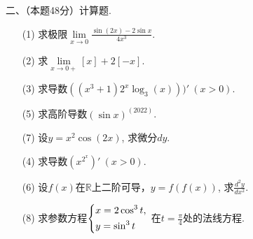 \documentclass[UTF8,a4paper,10pt]{ctexart}
\begin{document}
\noindent 二、（本题48分）计算题.\\





\noindent
\begin{minipage}{.5\textwidth}
\begin{itemize}
\item[(1)]
求极限$\lim\limits_{x \to 0} \frac{\sin{(2x)}-2\sin {x}}{4x^3}$.
\vspace{5cm}
\end{itemize}  
\end{minipage}
\hfill
\begin{minipage}{.4\textwidth}
\begin{itemize}
\item[(2)]
求$\lim\limits_{x \to 0+} [x]+2[-x]. $
\vspace{5cm}
\end{itemize}
\end{minipage}





\newpage
\noindent
\begin{minipage}{.45\textwidth}
\begin{itemize}
\item[(3)]
求导数$((x^3+1)2^x\log_3(x)))' \ (x > 0)$.
\vspace{5cm}
\item[(5)] 
求高阶导数$(\sin x)^{(2022)}$. 
 \vspace{5cm}
\item[(7)] 
设$y=x^2\cos(2x)$, 求微分$dy$.
\vspace{6cm}
\end{itemize}  
\end{minipage}
\hfill
\begin{minipage}{.55\textwidth}
\begin{itemize}
\item[(4)]
求导数$(x^{2^{x}})' \ (x > 0)$. 
\vspace{5cm}
\item[(6)]
设$f(x)$在$\mathbb{R}$上二阶可导，$y=f(f(x))$, 求$\frac{d^2y}{dx^2}$.
\vspace{5cm}
\item[(8)]
求参数方程$\begin{dcases}
x=2\cos^3t, \\
y=\sin^3t
\end{dcases}$ 在$t=\frac{\pi}{4}$处的法线方程.
\vspace{5.5cm}

\end{itemize}
\end{minipage}
\end{document}
